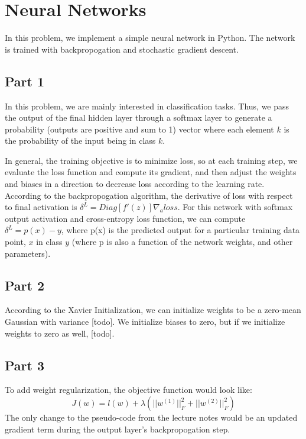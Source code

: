 \section{Neural Networks} \label{sec:prob1}
In this problem, we implement a simple neural network in Python.
The network is trained with backpropogation and stochastic gradient descent.

\subsection{Part 1}
In this problem, we are mainly interested in classification tasks.
Thus, we pass the output of the final hidden layer through a softmax layer to generate a probability (outputs are positive and sum to 1) vector where each element $k$ is the probability of the input being in class $k$.

In general, the training objective is to minimize loss, so at each training step, we evaluate the loss function and compute its gradient, and then adjust the weights and biases in a direction to decrease loss according to the learning rate.
According to the backpropogation algorithm, the derivative of loss with respect to final activation is $\delta^L = Diag[f'(z)] \nabla_a loss$.
For this network with softmax output activation and cross-entropy loss function, we can compute $\delta^L = p(x) - y$, where p(x) is the predicted output for a particular training data point, $x$ in class $y$ (where p is also a function of the network weights, and other parameters).


\subsection{Part 2}
According to the Xavier Initialization, we can initialize weights to be a zero-mean Gaussian with variance [todo].
We initialize biases to zero, but if we initialize weights to zero as well, [todo].

\subsection{Part 3}
To add weight regularization, the objective function would look like:
\begin{equation}
J(w) = l(w) + \lambda(||w^{(1)}||^2_F + ||w^{(2)}||^2_F)
\end{equation}
The only change to the pseudo-code from the lecture notes would be an updated gradient term during the output layer's backpropogation step.

